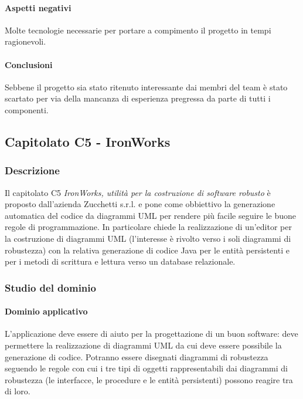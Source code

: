 	\paragraph{Aspetti negativi} \Spazio
     Molte tecnologie necessarie per portare a compimento il progetto in tempi ragionevoli.

	\paragraph{Conclusioni} \Spazio
	Sebbene il progetto sia stato ritenuto interessante dai membri del team è stato scartato per via della mancanza di esperienza pregressa da parte di tutti i componenti.
	
	\subsection{Capitolato C5 - IronWorks}
		\subsubsection{Descrizione}
		Il capitolato C5 \emph{IronWorks, utilità per la costruzione di software robusto} è proposto dall'azienda Zucchetti s.r.l. e pone come obbiettivo la generazione automatica del codice da diagrammi UML per rendere più facile seguire le buone regole di programmazione. In particolare chiede la realizzazione di un'editor per la costruzione di diagrammi UML (l'interesse è rivolto verso i soli diagrammi di robustezza) con la relativa generazione di codice Java per le entità persistenti e per i metodi di scrittura e lettura verso un database relazionale. 
		\subsubsection{Studio del dominio}
			\paragraph{Dominio applicativo} \Spazio
			L'applicazione deve essere di aiuto per la progettazione di un buon software: deve permettere la realizzazione di diagrammi UML da cui deve essere possibile la generazione di codice. Potranno essere disegnati diagrammi di robustezza seguendo le regole con cui i tre tipi di oggetti rappresentabili dai diagrammi di robustezza (le interfacce, le procedure e le entità persistenti) possono reagire tra di loro.
